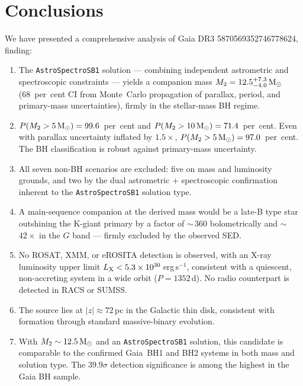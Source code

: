 \documentclass[usenatbib,fleqn]{mnras}
\newcommand{\Msun}{{\rm M}_\odot}
\begin{document}
\section{Conclusions}
\label{sec:conclusions}

We have presented a comprehensive analysis of Gaia DR3
5870569352746778624, finding:

\begin{enumerate}
\item The \texttt{AstroSpectroSB1} solution --- combining
  independent astrometric and spectroscopic constraints ---
  yields a companion mass $M_2 = 12.5^{+7.3}_{-4.0}\,\Msun$
  (68~per~cent CI from Monte~Carlo propagation of parallax,
  period, and primary-mass uncertainties), firmly in the
  stellar-mass BH regime.

\item $P(M_2 > 5\,\Msun) = 99.6$~per~cent and
  $P(M_2 > 10\,\Msun) = 71.4$~per~cent.  Even with parallax
  uncertainty inflated by $1.5\times$,
  $P(M_2 > 5\,\Msun) = 97.0$~per~cent.  The BH classification
  is robust against primary-mass uncertainty.

\item All seven non-BH scenarios are excluded: five on mass and
  luminosity grounds, and two by the dual astrometric +
  spectroscopic confirmation inherent to the
  \texttt{AstroSpectroSB1} solution type.

\item A main-sequence companion at the derived mass would be a
  late-B type star outshining the K-giant primary by a factor of
  $\sim$\,$360$ bolometrically and $\sim$\,$42\times$ in the
  $G$ band --- firmly excluded by the observed SED.

\item No ROSAT, XMM, or eROSITA detection is observed, with an
  X-ray luminosity upper limit
  $L_{\rm X} < 5.3 \times 10^{30}$\,erg\,s$^{-1}$, consistent
  with a quiescent, non-accreting system in a wide orbit
  ($P = 1352$\,d).  No radio counterpart is detected in RACS
  or SUMSS.

\item The source lies at $|z| \approx 72$\,pc in the Galactic
  thin disk, consistent with formation through standard
  massive-binary evolution.

\item With $M_2 \sim 12.5\,\Msun$ and an
  \texttt{AstroSpectroSB1} solution, this candidate is comparable
  to the confirmed Gaia~BH1 and BH2 systems in both mass and
  solution type.  The $39.9\sigma$ detection significance is among
  the highest in the Gaia BH sample.
\end{enumerate}
\end{document}
